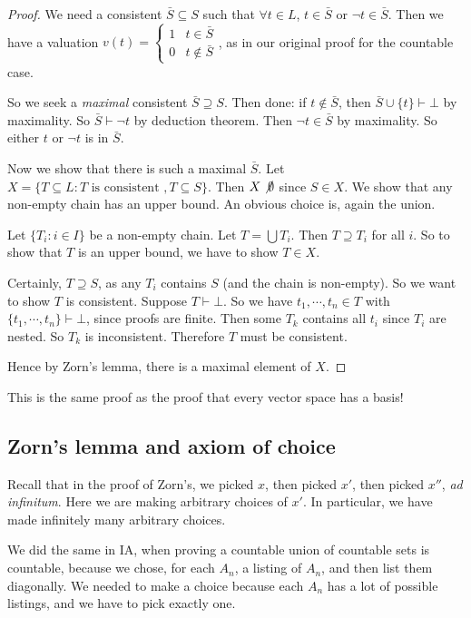 \documentclass[a4paper]{article}
\begin{document}
\begin{proof}
  We need a consistent $\bar S \subseteq S$ such that $\forall t\in L$, $t\in \bar S$ or $\neg t\in \bar S$. Then we have a valuation $v(t) = \begin{cases} 1 & t\in \bar S \\ 0 & t\not\in \bar S\end{cases}$, as in our original proof for the countable case.

  So we seek a \emph{maximal} consistent $\bar S\supseteq S$. Then done: if $t\not\in \bar S$, then $\bar S \cup \{t\}\vdash \bot$ by maximality. So $\bar S\vdash \neg t$ by deduction theorem. Then $\neg t \in \bar S$ by maximality. So either $t$ or $\neg t$ is in $\bar S$.

  Now we show that there is such a maximal $\bar S$. Let $X = \{ T\subseteq L: T\text{ is consistent }, T\subseteq S\}$. Then $X\not\emptyset$ since $S\in X$. We show that any non-empty chain has an upper bound. An obvious choice is, again the union.
  
  Let $\{T_i: i\in I\}$ be a non-empty chain. Let $T = \bigcup T_i$. Then $T\supseteq T_i$ for all $i$. So to show that $T$ is an upper bound, we have to show $T\in X$.

  Certainly, $T\supseteq S$, as any $T_i$ contains $S$ (and the chain is non-empty). So we want to show $T$ is consistent. Suppose $T\vdash \bot$. So we have $t_1, \cdots, t_n \in T$ with $\{t_1, \cdots, t_n\} \vdash \bot$, since proofs are finite. Then some $T_k$ contains all $t_i$ since $T_i$ are nested. So $T_k$ is inconsistent. Therefore $T$ must be consistent.

  Hence by Zorn's lemma, there is a maximal element of $X$.
\end{proof}
\note This is the same proof as the proof that every vector space has a basis!

\subsection{Zorn's lemma and axiom of choice}
Recall that in the proof of Zorn's, we picked $x$, then picked $x'$, then picked $x''$, \emph{ad infinitum}. Here we are making arbitrary choices of $x'$. In particular, we have made infinitely many arbitrary choices.

We did the same in IA, when proving a countable union of countable sets is countable, because we chose, for each $A_n$, a listing of $A_n$, and then list them diagonally. We needed to make a choice because each $A_n$ has a lot of possible listings, and we have to pick exactly one.
\end{document}

